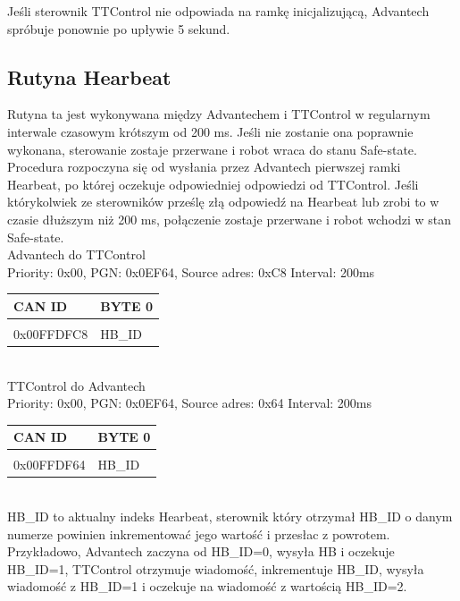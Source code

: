 \documentclass{article}
\begin{document}
Jeśli sterownik TTControl nie odpowiada na ramkę inicjalizującą, Advantech spróbuje ponownie po upływie 5 sekund. 

\subsection{Rutyna Hearbeat}
Rutyna ta jest wykonywana między Advantechem i TTControl w regularnym interwale czasowym krótszym od 200 ms. Jeśli nie zostanie ona poprawnie wykonana, sterowanie zostaje przerwane i robot wraca do stanu Safe-state. Procedura rozpoczyna się od wysłania przez Advantech pierwszej ramki Hearbeat, po której oczekuje odpowiedniej odpowiedzi od TTControl. Jeśli którykolwiek ze sterowników prześlę złą odpowiedź na Hearbeat lub zrobi to w czasie dłuższym niż 200 ms, połączenie zostaje przerwane i robot wchodzi w stan Safe-state.\\

Advantech do TTControl\\
Priority: 0x00, PGN: 0x0EF64, Source adres: 0xC8 Interval: 200ms\\
\begin{left}
\begin{tabular}{ |p{2cm}|p{1.5cm}|} 
 \hline
 CAN ID & BYTE 0 \\ \hline
 & \\
 0x00FFDFC8 & HB\_ID\\ 
 \hline
\end{tabular}
\end{left}\\


TTControl do Advantech\\
Priority: 0x00, PGN: 0x0EF64, Source adres: 0x64 Interval: 200ms\\
\begin{left}
\begin{tabular}{ |p{2cm}|p{1.5cm}|} 
 \hline
 CAN ID & BYTE 0\\ \hline
 & \\
 0x00FFDF64 & HB\_ID\\ 
 \hline
\end{tabular}
\end{left}\\

HB\_ID to aktualny indeks Hearbeat, sterownik który otrzymał HB\_ID o danym numerze powinien inkrementować jego wartość i przesłac z powrotem. Przykładowo, Advantech zaczyna od HB\_ID=0, wysyła HB i oczekuje HB\_ID=1, TTControl otrzymuje wiadomość, inkrementuje HB\_ID, wysyła wiadomość z HB\_ID=1 i oczekuje na wiadomość z wartością HB\_ID=2.
\end{document}
